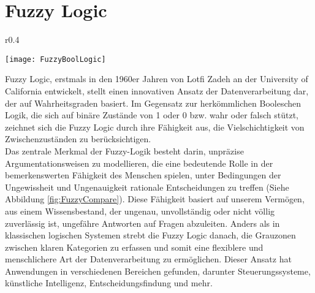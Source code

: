 \vspace{-2cm}
\section{Fuzzy Logic}\label{sec:FuzzyLogic}
\begin{wrapfigure}{r}{0.4\textwidth}
    \vspace{-1cm}
    \captionsetup{justification=centering,format=plain, font=small}
    \begin{center}
      \texttt{[image: FuzzyBoolLogic]}
    \end{center}
    \vspace{-0.5cm}
    \caption{Vergleich von Fuzzy Logic zu Boolescher Logik \cite{FuzzyLogicGeeks}}
    \label{fig:FuzzyCompare}
    \vspace{-0.5cm}
  \end{wrapfigure}
Fuzzy Logic, erstmals in den 1960er Jahren von Lotfi Zadeh an der University of California entwickelt, stellt einen innovativen Ansatz der Datenverarbeitung dar, der auf Wahrheitsgraden basiert. Im Gegensatz zur herkömmlichen Booleschen Logik, die sich auf binäre Zustände von 1 oder 0 bzw. wahr oder falsch stützt, zeichnet sich die Fuzzy Logic durch ihre Fähigkeit aus, die Vielschichtigkeit von Zwischenzuständen zu berücksichtigen.\cite{FuzzyLogicTechTarget}\\
Das zentrale Merkmal der Fuzzy-Logik besteht darin, unpräzise Argumentationsweisen zu modellieren, die eine bedeutende Rolle in der bemerkenswerten Fähigkeit des Menschen spielen, unter Bedingungen der Ungewissheit und Ungenauigkeit rationale Entscheidungen zu treffen (Siehe Abbildung \ref{fig:FuzzyCompare}). Diese Fähigkeit basiert auf unserem Vermögen, aus einem Wissensbestand, der ungenau, unvollständig oder nicht völlig zuverlässig ist, ungefähre Antworten auf Fragen abzuleiten. Anders als in klassischen logischen Systemen strebt die Fuzzy Logic danach, die Grauzonen zwischen klaren Kategorien zu erfassen und somit eine flexiblere und menschlichere Art der Datenverarbeitung zu ermöglichen. Dieser Ansatz hat Anwendungen in verschiedenen Bereichen gefunden, darunter Steuerungssysteme, künstliche Intelligenz, Entscheidungsfindung und mehr. \cite{LoftiFuzzyLogic}

